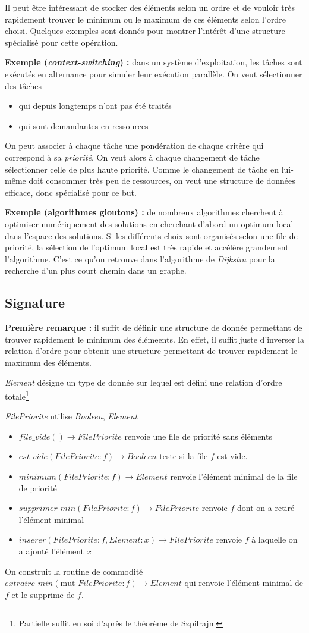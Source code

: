 \documentclass[../../../main.tex]{subfiles}
\begin{document}
Il peut être intéressant de stocker des éléments selon un ordre et de vouloir très rapidement trouver le minimum ou le maximum de ces éléments selon l'ordre choisi. Quelques exemples sont donnés pour montrer l'intérêt d'une structure spécialisé pour cette opération. 

\textbf{Exemple (\textit{context-switching}) :} dans un système d'exploitation, les tâches sont exécutés en alternance pour simuler leur exécution parallèle. On veut sélectionner des tâches 
\begin{itemize}
	\item qui depuis longtemps n'ont pas été traités
	\item qui sont demandantes en ressources
\end{itemize}
On peut associer à chaque tâche une pondération de chaque critère qui correspond à sa \textit{priorité}. On veut alors à chaque changement de tâche sélectionner celle de plus haute priorité. Comme le changement de tâche en lui-même doit consommer très peu de ressources, on veut une structure de données efficace, donc spécialisé pour ce but.

\textbf{Exemple (algorithmes gloutons) :} de nombreux algorithmes cherchent à optimiser numériquement des solutions en cherchant d'abord un optimum local dans l'espace des solutions. Si les différents choix sont organisés selon une file de priorité, la sélection de l'optimum local est très rapide et accélère grandement l'algorithme. C'est ce qu'on retrouve dans l'algorithme de \textit{Dijkstra} pour la recherche d'un plus court chemin dans un graphe.
\subsection{Signature}
\textbf{Première remarque :} il suffit de définir une structure de donnée permettant de trouver rapidement le minimum des élémeents. En effet, il suffit juste d'inverser la relation d'ordre pour obtenir une structure permettant de trouver rapidement le maximum des éléments.

\textit{Element} désigne un type de donnée sur lequel est défini une relation d'ordre totale\footnote{Partielle suffit en soi d'après le théorème de Szpilrajn.}

\textit{FilePriorite} utilise \textit{Booleen}, \textit{Element}
\begin{itemize}
	\item $file\_vide()\rightarrow FilePriorite$ renvoie une file de priorité sans éléments
	\item $est\_vide(FilePriorite:f)\rightarrow Booleen$ teste si la file $f$ est vide.
	\item $minimum(FilePriorite:f)\rightarrow Element$ renvoie l'élément minimal de la file de priorité
	\item $supprimer\_min(FilePriorite:f)\rightarrow FilePriorite$ renvoie $f$ dont on a retiré l'élément minimal
	\item $inserer(FilePriorite:f, Element:x)\rightarrow FilePriorite$ renvoie $f$ à laquelle on a ajouté l'élément $x$
\end{itemize}
On construit la routine de commodité $extraire\_min(\text{mut }FilePriorite:f)\rightarrow Element$ qui renvoie l'élément minimal de $f$ et le supprime de $f$.
\end{document}
